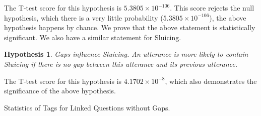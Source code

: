 \documentclass[bsc,frontabs,twoside,singlespacing,parskip,deptreport]{infthesis}     %
\newtheorem{hypo}{Hypothesis}[chapter]
\begin{document}
The T-test score for this hypothesis is $5.3805 \times 10^{-106}$. This score rejects the null hypothesis, which there is a very little probability ($5.3805 \times 10^{-106}$), the above hypothesis happens by chance. We prove that the above statement is statistically significant. We also have a similar statement for Sluicing.

\begin{hypo}
Gaps influence Sluicing. An utterance is more likely to contain Sluicing if there is no gap between this utterance and its previous utterance.
\end{hypo}

The T-test score for this hypothesis is $4.1702 \times 10^{-8}$, which also demonstrates the significance of the above hypothesis.

\begin{minipage}{\textwidth}


        \begin{minipage}[t]{0.45\textwidth}
            \centering
            \makeatletter{}\makeatother


\caption{Statistics of Tags for Linked Questions without Gaps.}
\label{tab:quegaplink}



\end{minipage}
\end{minipage}
\end{document}
